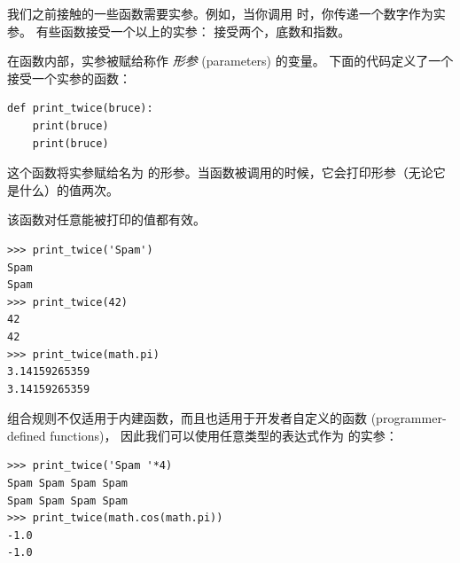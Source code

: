 我们之前接触的一些函数需要实参。例如，当你调用  时，你传递一个数字作为实参。
有些函数接受一个以上的实参：  接受两个，底数和指数。


在函数内部，实参被赋给称作 {\em 形参} (parameters) 的变量。
下面的代码定义了一个接受一个实参的函数：


\begin{lstlisting}
def print_twice(bruce):
    print(bruce)
    print(bruce)
\end{lstlisting}

%

这个函数将实参赋给名为  的形参。当函数被调用的时候，它会打印形参（无论它是什么）的值两次。


该函数对任意能被打印的值都有效。

\begin{lstlisting}
>>> print_twice('Spam')
Spam
Spam
>>> print_twice(42)
42
42
>>> print_twice(math.pi)
3.14159265359
3.14159265359
\end{lstlisting}

%

组合规则不仅适用于内建函数，而且也适用于开发者自定义的函数 (programmer-defined functions)， 因此我们可以使用任意类型的表达式作为  的实参：

  

\begin{lstlisting}
>>> print_twice('Spam '*4)
Spam Spam Spam Spam
Spam Spam Spam Spam
>>> print_twice(math.cos(math.pi))
-1.0
-1.0
\end{lstlisting}

%

